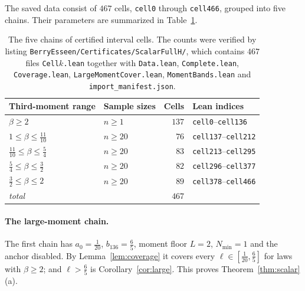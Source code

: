 \documentclass[10pt,a4paper]{article}
\theoremstyle{plain}
\theoremstyle{definition}
\newcommand{\lean}[1]{\texttt{#1}}
\newcommand{\file}[1]{\texttt{#1}}
\begin{document}
The saved data consist of $467$ cells, \lean{cell0} through \lean{cell466},
grouped into five chains. Their parameters are summarized in
Table~\ref{tab:scalar-cells}.

\begin{table}[ht]
\centering
\begin{tabular}{@{}llrl@{}}
\toprule
Third-moment range & Sample sizes & Cells & Lean indices \\
\midrule
$\beta\ge2$ & $n\ge1$ & $137$ & \lean{cell0}--\lean{cell136} \\
$1\le\beta\le\tfrac{11}{10}$ & $n\ge20$ & $76$ & \lean{cell137}--\lean{cell212} \\
$\tfrac{11}{10}\le\beta\le\tfrac54$ & $n\ge20$ & $83$ & \lean{cell213}--\lean{cell295} \\
$\tfrac54\le\beta\le\tfrac32$ & $n\ge20$ & $82$ & \lean{cell296}--\lean{cell377} \\
$\tfrac32\le\beta\le2$ & $n\ge20$ & $89$ & \lean{cell378}--\lean{cell466} \\
\midrule
\multicolumn{2}{l}{\emph{total}} & $467$ & \\
\bottomrule
\end{tabular}
\caption{The five chains of certified interval cells. The counts were verified
by listing \file{BerryEsseen/Certificates/ScalarFullH/}, which contains $467$
files \file{Cell$k$.lean} together with \file{Data.lean},
\file{Complete.lean}, \file{Coverage.lean}, \file{LargeMomentCover.lean},
\file{MomentBands.lean} and \file{import\_manifest.json}.}
\label{tab:scalar-cells}
\end{table}

\paragraph{The large-moment chain.}
The first chain has $a_0=\tfrac1{20}$, $b_{136}=\tfrac65$, moment floor
$L=2$, $N_{\min}=1$ and the anchor disabled. By Lemma~\ref{lem:coverage} it
covers every $\ell\in[\tfrac1{20},\tfrac65]$ for laws with $\beta\ge2$; and
$\ell>\tfrac65$ is Corollary~\ref{cor:large}. This proves
Theorem~\ref{thm:scalar}(a).
\end{document}
